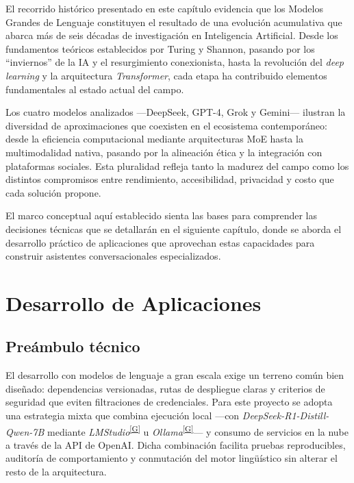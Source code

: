 \documentclass[12pt,a4paper]{report}
\numberwithin{figure}{section}
\begin{document}
El recorrido histórico presentado en este capítulo evidencia que los Modelos Grandes de Lenguaje constituyen el resultado de una evolución acumulativa que abarca más de seis décadas de investigación en Inteligencia Artificial. Desde los fundamentos teóricos establecidos por Turing y Shannon, pasando por los ``inviernos'' de la IA y el resurgimiento conexionista, hasta la revolución del \textit{deep learning} y la arquitectura \textit{Transformer}, cada etapa ha contribuido elementos fundamentales al estado actual del campo.

Los cuatro modelos analizados ---DeepSeek, GPT-4, Grok y Gemini--- ilustran la diversidad de aproximaciones que coexisten en el ecosistema contemporáneo: desde la eficiencia computacional mediante arquitecturas MoE hasta la multimodalidad nativa, pasando por la alineación ética y la integración con plataformas sociales. Esta pluralidad refleja tanto la madurez del campo como los distintos compromisos entre rendimiento, accesibilidad, privacidad y costo que cada solución propone.

El marco conceptual aquí establecido sienta las bases para comprender las decisiones técnicas que se detallarán en el siguiente capítulo, donde se aborda el desarrollo práctico de aplicaciones que aprovechan estas capacidades para construir asistentes conversacionales especializados.


\chapter{Desarrollo de Aplicaciones}
\label{ch:desarrollo_aplicaciones}

\section{Preámbulo técnico}
\label{sec:preambulo_tecnico}

El desarrollo con modelos de lenguaje a gran escala exige un terreno común bien diseñado: dependencias versionadas, rutas de despliegue claras y criterios de seguridad que eviten filtraciones de credenciales. Para este proyecto se adopta una estrategia mixta que combina ejecución local —con \textit{DeepSeek-R1-Distill-Qwen-7B} mediante \textit{LMStudio}\textsuperscript{\hyperref[glos:lmstudio]{[G]}} u \textit{Ollama}\textsuperscript{\hyperref[glos:ollama]{[G]}}— y consumo de servicios en la nube a través de la API de OpenAI. Dicha combinación facilita pruebas reproducibles, auditoría de comportamiento y conmutación del motor lingüístico sin alterar el resto de la arquitectura.
\end{document}

